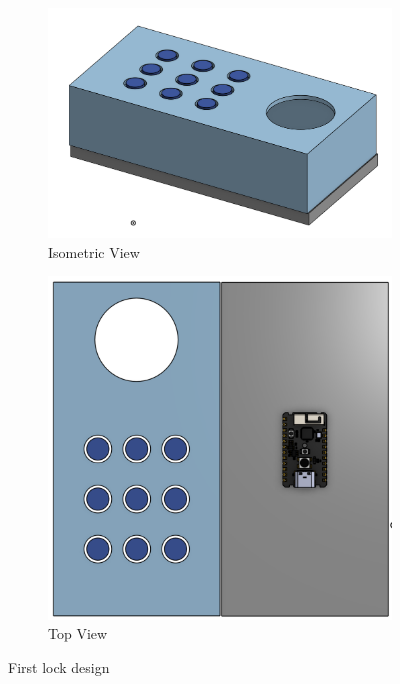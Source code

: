 \begin{figure}[htbp]
    \centering
    \begin{subfigure}[b]{0.48\textwidth}
        \includegraphics[width=\textwidth]{./img/isoView.png}
        \caption{Isometric View}
        \label{fig:isoView}
    \end{subfigure}
    \hfill
    \begin{subfigure}[b]{0.48\textwidth}
        \includegraphics[width=\textwidth]{./img/topView.png}
        \caption{Top View}
        \label{fig:topView}
    \end{subfigure}
    \caption{First lock design}
\end{figure}

